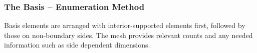 \documentclass[compress]{beamer}
\begin{document}
\begin{frame}
  \frametitle{The Basis -- Enumeration Method}
  Basis elements are arranged with interior-supported elements first, followed by those on non-boundary sides.
  The mesh provides relevant counts and any needed information such as side dependent dimensions.
  \pause
  \pause
\end{frame}
\end{document}
